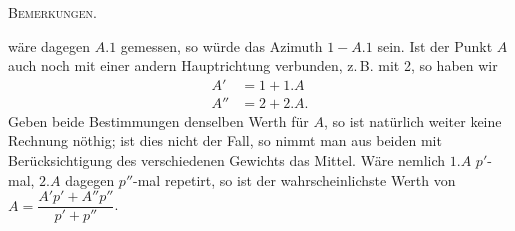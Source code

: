 \begingroup
\newcommand{\IXarc}[1]{\overset{\frown}{#1}}
\clearpage
{}\hfill\textsc{Bemerkungen.}\hfill\mbox{}\par\medskip
\noindent wäre dagegen $A.1$ gemessen, so würde das Azimuth $1-A.1$ sein. Ist der Punkt $A$ auch noch mit einer andern Hauptrichtung verbunden, z.\,B. mit 2, so haben wir
\[
\begin{aligned}
A'&=1+1.A\\
A''&=2+2.A.
\end{aligned}
\]
Geben beide Bestimmungen denselben Werth für $A$, so ist natürlich weiter keine Rechnung nöthig; ist dies nicht der Fall, so nimmt man aus beiden mit Berücksichtigung des verschiedenen Gewichts das Mittel. Wäre nemlich $1.A$ $p'$-mal, $2.A$ dagegen $p''$-mal repetirt, so ist der wahrscheinlichste Werth von $A=\dfrac{A'p'+A''p''}{p'+p''}$.

